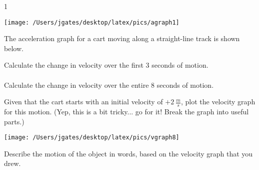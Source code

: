 
\AddToShipoutPicture*{\BackgroundPic}

\addtocounter {ProbNum} {1}

\begin{floatingfigure}[r]{.44\textwidth}
\texttt{[image: /Users/jgates/desktop/latex/pics/agraph1]}
\end{floatingfigure}
 
{\bf \Large{}} The acceleration graph for a cart moving along a straight-line track is shown below.\bigskip
       
Calculate the change in velocity over the first 3 seconds of motion.   \paragraph{}
\noindent
\vfill

Calculate the change in velocity over the entire 8 seconds of motion.    
\vfill

Given that the cart starts with an initial velocity of ${+2~\tfrac{m}{s}}$, plot the velocity graph for this motion.  (Yep, this is a bit tricky... go for it! Break the graph into useful parts.) 
\begin{center}
\texttt{[image: /Users/jgates/desktop/latex/pics/vgraph8]}
\end{center}

Describe the motion of the object in words, based on the velocity graph that you drew.
\vfill



\newpage